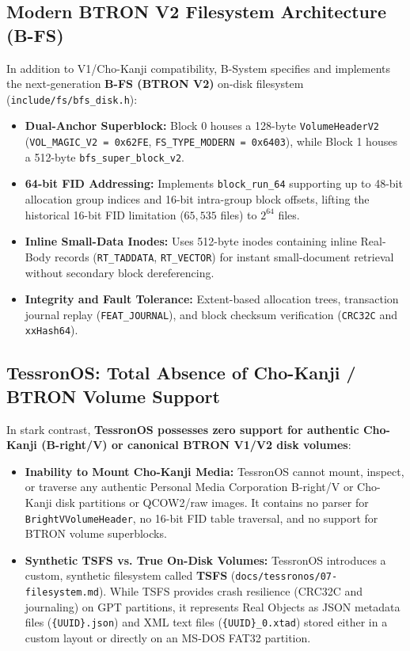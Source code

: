 \documentclass[10pt,journal,compsoc,twocolumn]{article}
\begin{document}
\subsection{Modern BTRON V2 Filesystem Architecture (B-FS)}
In addition to V1/Cho-Kanji compatibility, B-System specifies and implements the next-generation \textbf{B-FS (BTRON V2)} on-disk filesystem (\texttt{include/fs/bfs\_disk.h}):
\begin{itemize}[leftmargin=*]
    \item \textbf{Dual-Anchor Superblock:} Block 0 houses a 128-byte \texttt{VolumeHeaderV2} (\texttt{VOL\_MAGIC\_V2 = 0x62FE}, \texttt{FS\_TYPE\_MODERN = 0x6403}), while Block 1 houses a 512-byte \texttt{bfs\_super\_block\_v2}.
    \item \textbf{64-bit FID Addressing:} Implements \texttt{block\_run\_64} supporting up to 48-bit allocation group indices and 16-bit intra-group block offsets, lifting the historical 16-bit FID limitation ($65,535$ files) to $2^{64}$ files.
    \item \textbf{Inline Small-Data Inodes:} Uses 512-byte inodes containing inline Real-Body records (\texttt{RT\_TADDATA}, \texttt{RT\_VECTOR}) for instant small-document retrieval without secondary block dereferencing.
    \item \textbf{Integrity and Fault Tolerance:} Extent-based allocation trees, transaction journal replay (\texttt{FEAT\_JOURNAL}), and block checksum verification (\texttt{CRC32C} and \texttt{xxHash64}).
\end{itemize}

\subsection{TessronOS: Total Absence of Cho-Kanji / BTRON Volume Support}
In stark contrast, \textbf{TessronOS possesses zero support for authentic Cho-Kanji (B-right/V) or canonical BTRON V1/V2 disk volumes}:
\begin{itemize}[leftmargin=*]
    \item \textbf{Inability to Mount Cho-Kanji Media:} TessronOS cannot mount, inspect, or traverse any authentic Personal Media Corporation B-right/V or Cho-Kanji disk partitions or QCOW2/raw images. It contains no parser for \texttt{BrightVVolumeHeader}, no 16-bit FID table traversal, and no support for BTRON volume superblocks.
    \item \textbf{Synthetic TSFS vs. True On-Disk Volumes:} TessronOS introduces a custom, synthetic filesystem called \textbf{TSFS} (\texttt{docs/tessronos/07-filesystem.md}). While TSFS provides crash resilience (CRC32C and journaling) on GPT partitions, it represents Real Objects as JSON metadata files (\texttt{\{UUID\}.json}) and XML text files (\texttt{\{UUID\}\_0.xtad}) stored either in a custom layout or directly on an MS-DOS FAT32 partition.
\end{itemize}
\end{document}
